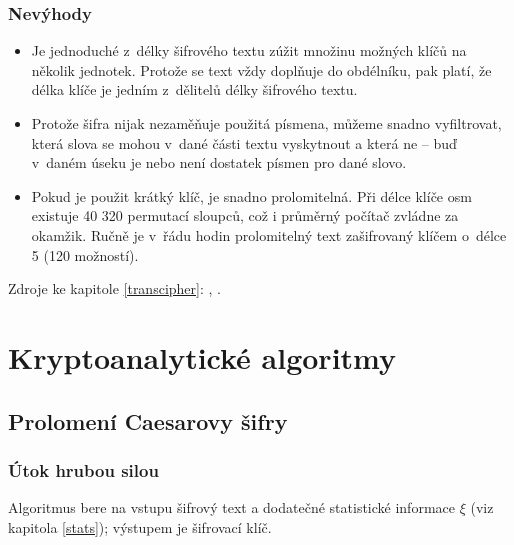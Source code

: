 \documentclass[12pt]{article}
\theoremstyle{definition}
\newcommand{\stats}{\xi}
\begin{document}
\subsubsection{Nevýhody}
\begin{itemize}
\item Je jednoduché z~délky šifrového textu zúžit množinu možných klíčů na několik jednotek. Protože se text vždy doplňuje do obdélníku, pak platí, že délka klíče je jedním z~dělitelů délky šifrového textu. 
\item Protože šifra nijak nezaměňuje použitá písmena, můžeme snadno vyfiltrovat, která slova se mohou v~dané části textu vyskytnout a která ne -- buď v~daném úseku je nebo není dostatek písmen pro dané slovo.
\item Pokud je použit krátký klíč, je snadno prolomitelná. Při délce klíče osm existuje 40 320 permutací sloupců, což i průměrný počítač zvládne za okamžik. Ručně je v~řádu hodin prolomitelný text zašifrovaný klíčem o~délce 5 (120 možností). 
\end{itemize}

Zdroje ke kapitole \ref{transcipher}: \cite{transen}, \cite{cryptography}.







\newpage
\section{Kryptoanalytické algoritmy}
\label{crypto_chapter}


\subsection{Prolomení Caesarovy šifry}
\subsubsection{Útok hrubou silou}
Algoritmus bere na vstupu šifrový text a dodatečné statistické informace $\stats$ (viz kapitola \ref{stats}); výstupem je šifrovací klíč. 
\end{document}
